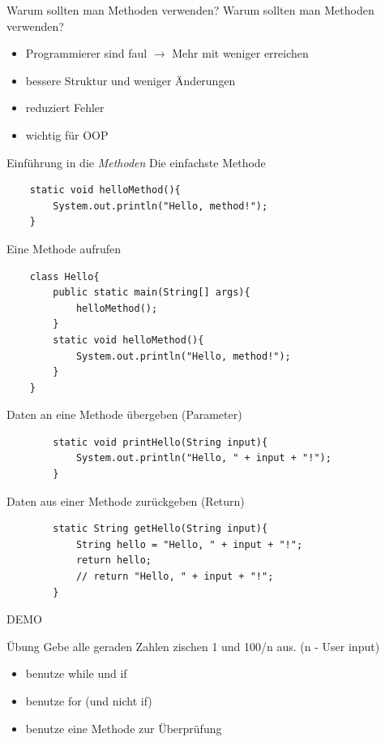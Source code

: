 \begin{frame}{Warum sollten man Methoden verwenden?}
	Warum sollten man Methoden verwenden?
	\begin{itemize}
		\item<1-> Programmierer sind faul $\rightarrow$ Mehr mit weniger erreichen
		\item<2-> bessere Struktur und weniger Änderungen
		\item<3-> reduziert Fehler
		\item<4-> wichtig für OOP
	\end{itemize}
	
\end{frame}

\begin{frame} {Einführung in die \emph{Methoden}}
	Die einfachste Methode
	\begin{lstlisting}
	static void helloMethod(){
		System.out.println("Hello, method!");	
	}
	\end{lstlisting}
\framebreak
	Eine Methode aufrufen
	\begin{lstlisting}
	class Hello{
		public static main(String[] args){
			helloMethod();
		}
		static void helloMethod(){
			System.out.println("Hello, method!");	
		}
	}
	\end{lstlisting}

\framebreak
	Daten an eine Methode übergeben (Parameter)
	\begin{lstlisting}
		static void printHello(String input){
			System.out.println("Hello, " + input + "!");	
		}
	\end{lstlisting}

\framebreak
	Daten aus einer Methode zurückgeben (Return)
	\begin{lstlisting}
		static String getHello(String input){
			String hello = "Hello, " + input + "!";	
			return hello;
			// return "Hello, " + input + "!";
		}
	\end{lstlisting}

\framebreak
DEMO
	

\end{frame}

\begin{frame}{Übung}
	Gebe alle geraden Zahlen zischen 1 und 100/n aus. (n - User input)
	\begin{itemize}
		\item<2-> benutze while und if
		\item<3-> benutze for (und nicht if)
		\item<4-> benutze eine Methode zur Überprüfung
		
	\end{itemize}
\end{frame}


